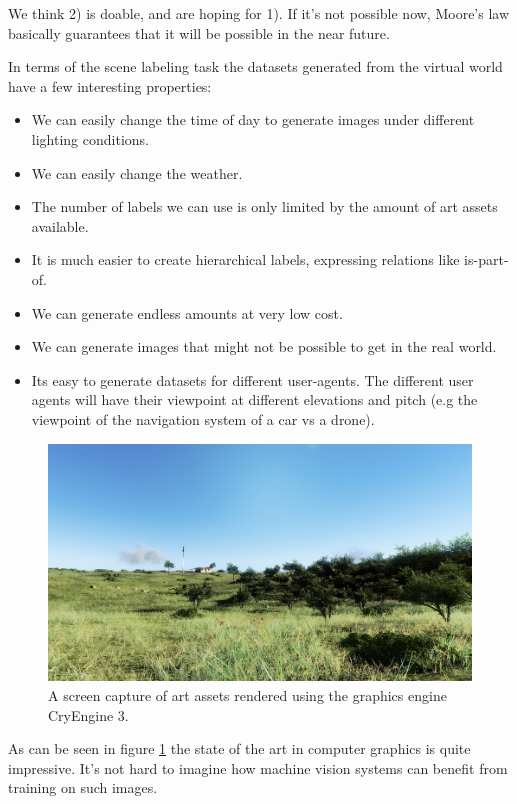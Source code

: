 \documentclass[11pt]{article}
\begin{document}
We think 2) is doable, and are hoping for 1).  If it's not possible now, Moore's law basically guarantees that it will be possible in the near future.

In terms of the scene labeling task the datasets generated from the virtual world have a few interesting properties:

\begin{itemize}
 \item We can easily change the time of day to generate images under different lighting conditions.
 \item We can easily change the weather.
 \item The number of labels we can use is only limited by the amount of art assets available.
 \item It is much easier to create hierarchical labels, expressing relations like is-part-of.
 \item We can generate endless amounts at very low cost.
 \item We can generate images that might not be possible to get in the real world.
 \item Its easy to generate datasets for different user-agents.  The different user agents will have their viewpoint at different elevations and pitch (e.g the viewpoint of the navigation system of a car vs a drone).
\end{itemize}


\begin{figure}[htb!]
  \centering
  \includegraphics[width=\textwidth]{myce3ss.jpg}
  \caption{A screen capture of art assets rendered using the graphics engine CryEngine 3.}
  \label{fig:cryEngine}
\end{figure}

As can be seen in figure \ref{fig:cryEngine} the state of the art in computer graphics is quite impressive. It's not hard to imagine how machine vision systems can benefit from training on such images.
\end{document}
